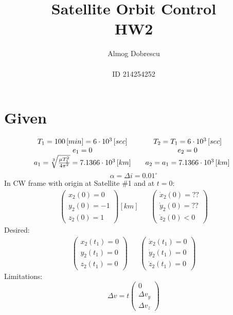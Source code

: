 \documentclass[11pt, a4paper]{article}
\title{Satellite Orbit Control \\ HW2}
\author{Almog Dobrescu\\\\ID 214254252}
\begin{document}
\maketitle

\thispagestyle{empty}
\newpage
\setcounter{page}{1}

\tableofcontents
\vfil
\listoffigures
\newpage

\section{Given}
\begin{equation*}
    \begin{matrix}
        T_1=100\left[min\right] = 6\cdot10^3\left[sec\right] && T_2 = T_1 = 6\cdot10^3\left[sec\right] \\
        e_1 = 0 && e_2 = 0 \\
        a_1 = \sqrt[3]{\frac{\mu T_1^2}{4\pi^2}} = 7.1366\cdot10^3\left[km\right] && a_2 = a_1 = 7.1366\cdot10^3\left[km\right]
    \end{matrix}\\
\end{equation*}
\begin{equation*}
    \alpha=\Delta i = 0.01^\circ
\end{equation*}
In CW frame with origin at Satellite \#1 and at $t=0$:
\begin{equation*}
    \begin{matrix}
    \begin{pmatrix}
        x_2(0)=0 \\ y_2(0)=-1 \\ z_2(0)=1
    \end{pmatrix}\left[km\right] &&
    \begin{pmatrix}
        \dot{x}_2(0)=?? \\ \dot{y}_2(0) = ?? \\ \dot{z}_2(0)<0
    \end{pmatrix}
    \end{matrix}
\end{equation*}
Desired:
\begin{equation*}
    \begin{matrix}
    \begin{pmatrix}
        x_2(t_1)=0 \\ y_2(t_1)=0 \\ z_2(t_1)=0
    \end{pmatrix} &&
    \begin{pmatrix}
        \dot{x}_2(t_1)=0 \\ \dot{y}_2(t_1)=0 \\ \dot{z}_2(t_1)=0
    \end{pmatrix}
    \end{matrix}
\end{equation*}
Limitations:
\begin{equation*}
    \Delta v = t \begin{pmatrix}
        0\\
        \Delta v_y\\
        \Delta v_z
    \end{pmatrix}
\end{equation*}
\end{document}

